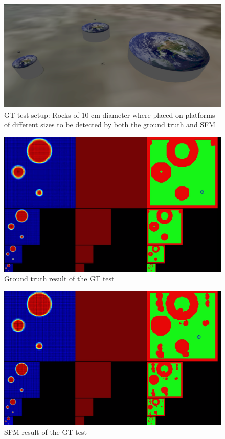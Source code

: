 \begin{figure}[ht]
\centering
\includegraphics[scale=0.18]{images/methodology/Test.png}
\caption{GT test setup: Rocks of 10 cm diameter where placed on platforms of different sizes to be detected by both the ground truth and SFM}
\label{fig:gt_test_setup}
\end{figure}

\begin{figure}[ht]
\centering
\includegraphics[scale=0.14]{images/methodology/GT.png}
\caption{Ground truth result of the GT test}
\label{fig:gt_test_gt} %
\end{figure}

\begin{figure}[ht]
\centering
\includegraphics[scale=0.14]{images/methodology/SFM.png}
\caption{SFM result of the GT test}
\label{fig:gt_test_sfm}
\end{figure} %

